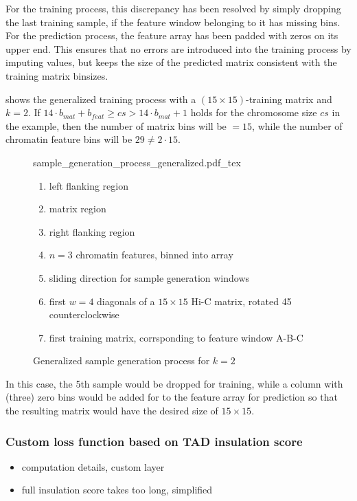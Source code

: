 For the training process, this discrepancy has been resolved by simply dropping the last training sample, 
if the feature window belonging to it has missing bins.
For the prediction process, the feature array has been padded with zeros on its upper end.
This ensures that no errors are introduced into the training process by imputing values,
but keeps the size of the predicted matrix consistent with the training
matrix binsizes.

 shows the generalized training process with a $(15\times15)$-training matrix and $k=2$. 
If $14\cdot b_{mat} + b_{feat} \geq cs > 14\cdot b_{mat} + 1$ holds for the chromosome size $cs$ in the example,
then the number of matrix bins will be $=15$, while the number of chromatin feature bins will be $29 \not = 2 \cdot 15$.
\begin{figure}
 \begin{minipage}{0.60\textwidth}
   \centering
    \small
    {sample_generation_process_generalized.pdf_tex}
    \caption{Generalized sample generation process for $k=2$}
    \label{fig:methods:sample_gen_generalized}
 \end{minipage}\hfill
 \begin{minipage}{0.3\textwidth}
 \scriptsize
  \begin{enumerate}[label=\Alph*:]
   \raggedright
    \item left flanking region
    \item matrix region
    \item right flanking region
    \item $n=3$ chromatin features, binned into array
    \item sliding direction for sample generation windows
    \item first $w=4$ diagonals of a $15\times15$ Hi-C matrix, rotated \SI{45}{\deg} counterclockwise
    \item first training matrix, corrsponding to feature window A-B-C
\end{enumerate}
 \end{minipage}
\end{figure}
In this case, the 5th sample would be dropped for training,
while a column with (three) zero bins would be added for to the feature array for prediction
so that the resulting matrix would have the desired size of $15 \times 15$.


\subsubsection{Custom loss function based on TAD insulation score}
\begin{itemize}
 \item computation details, custom layer
 \item full insulation score takes too long, simplified
\end{itemize}

